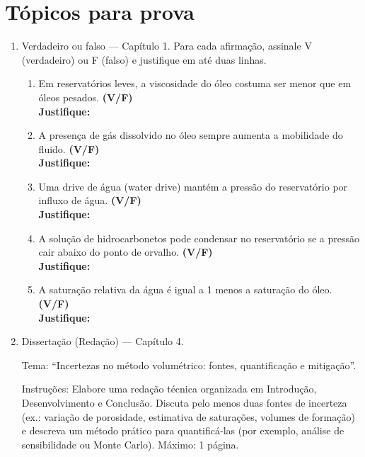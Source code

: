 \documentclass[11pt,a4paper]{article}
\begin{document}
\section{Tópicos para prova}
\begin{enumerate}
\item Verdadeiro ou falso — Capítulo 1. Para cada afirmação, assinale V (verdadeiro) ou F (falso) e justifique em até duas linhas.
\begin{enumerate}[label=\alph*)]
\item Em reservatórios leves, a viscosidade do óleo costuma ser menor que em óleos pesados. \hfill \textbf{(V/F)}\\
\textbf{Justifique:} \vspace{2\baselineskip}
\item A presença de gás dissolvido no óleo sempre aumenta a mobilidade do fluido. \hfill \textbf{(V/F)}\\
\textbf{Justifique:} \vspace{2\baselineskip}
\item Uma drive de água (water drive) mantém a pressão do reservatório por influxo de água. \hfill \textbf{(V/F)}\\
\textbf{Justifique:} \vspace{2\baselineskip}
\item A solução de hidrocarbonetos pode condensar no reservatório se a pressão cair abaixo do ponto de orvalho. \hfill \textbf{(V/F)}\\
\textbf{Justifique:} \vspace{2\baselineskip}
\item A saturação relativa da água é igual a 1 menos a saturação do óleo. \hfill \textbf{(V/F)}\\
\textbf{Justifique:} \vspace{2\baselineskip}
\end{enumerate}

\vspace{4mm}

\item Dissertação (Redação) — Capítulo 4.

Tema: ``Incertezas no método volumétrico: fontes, quantificação e mitigação''.

Instruções: Elabore uma redação técnica organizada em Introdução, Desenvolvimento e Conclusão. Discuta pelo menos duas fontes de incerteza (ex.: variação de porosidade, estimativa de saturações, volumes de formação) e descreva um método prático para quantificá‑las (por exemplo, análise de sensibilidade ou Monte Carlo). Máximo: 1 página.


\end{enumerate}
\end{document}
